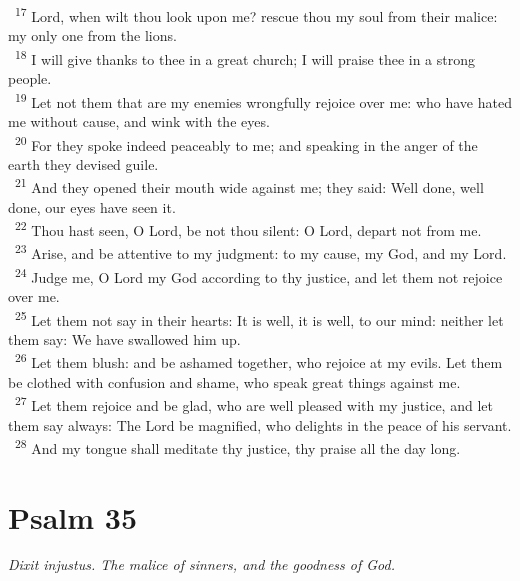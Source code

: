 \documentclass[a5paper,12pt]{article}
\begin{document}
\begin{multicols*}{2}
~\textsuperscript{17} Lord, when wilt thou look upon me? rescue thou my soul from their malice: my only one from the lions.\\
~\textsuperscript{18} I will give thanks to thee in a great church; I will praise thee in a strong people.\\
~\textsuperscript{19} Let not them that are my enemies wrongfully rejoice over me: who have hated me without cause, and wink with the eyes.\\
~\textsuperscript{20} For they spoke indeed peaceably to me; and speaking in the anger of the earth they devised guile.\\
~\textsuperscript{21} And they opened their mouth wide against me; they said: Well done, well done, our eyes have seen it.\\
~\textsuperscript{22} Thou hast seen, O Lord, be not thou silent: O Lord, depart not from me.\\
~\textsuperscript{23} Arise, and be attentive to my judgment: to my cause, my God, and my Lord.\\
~\textsuperscript{24} Judge me, O Lord my God according to thy justice, and let them not rejoice over me.\\
~\textsuperscript{25} Let them not say in their hearts: It is well, it is well, to our mind: neither let them say: We have swallowed him up.\\
~\textsuperscript{26} Let them blush: and be ashamed together, who rejoice at my evils. Let them be clothed with confusion and shame, who speak great things against me.\\
~\textsuperscript{27} Let them rejoice and be glad, who are well pleased with my justice, and let them say always: The Lord be magnified, who delights in the peace of his servant.\\
~\textsuperscript{28} And my tongue shall meditate thy justice, thy praise all the day long.\\

\section{Psalm 35}
\label{sec:orge7f840f}
\emph{Dixit injustus. The malice of sinners, and the goodness of God.}\\


\end{multicols*}
\end{document}
